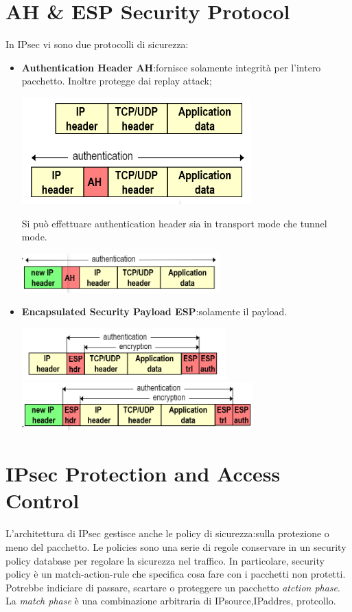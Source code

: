 \documentclass{book}
\theoremstyle{remark}
\begin{document}
\section{AH \& ESP Security Protocol}
In IPsec vi sono due protocolli di sicurezza:\begin{itemize}
	\item \textbf{Authentication Header AH}:fornisce solamente integrità per l'intero pacchetto\@. Inoltre protegge dai replay attack;\@
	\begin{center}
		\includegraphics[scale=0.6]{2021-12-12-17-11-08.png}
	\end{center}
	Si può effettuare authentication header sia in transport mode che tunnel mode\@.
	\begin{center}
		\includegraphics[scale=0.6]{2021-12-12-17-13-15.png}
	\end{center}
	\item \textbf{Encapsulated Security Payload ESP}:\@autentica solamente il payload\@.
	\begin{center}
		\includegraphics[scale=0.6]{2021-12-12-17-15-04.png}\newline
		\includegraphics[scale=0.6]{2021-12-12-17-15-37.png}
	\end{center}
\end{itemize}
\section{IPsec Protection and Access Control}
L'architettura di IPsec gestisce anche le policy di sicurezza:\@specifica sulla protezione o meno del pacchetto\@. Le policies sono una serie di regole conservare in un security policy database per regolare la sicurezza nel traffico\@. \newline
In particolare, security policy è un match-action-rule che specifica cosa fare con i pacchetti non protetti\@. Potrebbe indiciare di passare, scartare o proteggere un pacchetto \emph{atction phase}\@. La \emph{match phase} è una combinazione arbitraria di IPsource,IPaddres, protcollo\@.
\end{document}
